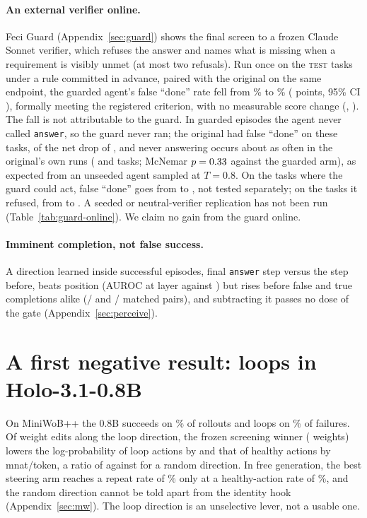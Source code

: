 \paragraph{An external verifier online.} Feci Guard (Appendix~\ref{sec:guard}) shows the final screen to a frozen Claude Sonnet verifier, which refuses the answer and names what is missing when a requirement is visibly unmet (at most two refusals). Run once on the \OgN{} \textsc{test} tasks under a rule committed in advance, paired with the original on the same endpoint, the guarded agent's false ``done'' rate fell from \OgFdBase\% to \OgFdGuard\% (\OgFdDiff{} points, 95\% CI \OgFdDiffCi), formally meeting the registered criterion, with no measurable score change (\OgScoreDiff, \OgScoreDiffCi). The fall is not attributable to the guard. In \ogDecNoAnsN{} guarded episodes the agent never called \texttt{answer}, so the guard never ran; the original had \ogDecNoAnsFdb{} false ``done'' on these tasks, \ogDecNoAnsFdb{} of the net drop of \ogFdNetDrop, and never answering occurs about as often in the original's own runs (\ogNoAnsModal{} and \ogNoAnsPod{} tasks; McNemar $p=0.33$ against the guarded arm), as expected from an unseeded agent sampled at $T=0.8$. On the \ogDecAnsN{} tasks where the guard could act, false ``done'' goes from \ogDecAnsFdb{} to \ogDecAnsFdg, not tested separately; on the \ogDecRefN{} tasks it refused, from \ogDecRefFdb{} to \ogDecRefFdg. A seeded or neutral-verifier replication has not been run (Table~\ref{tab:guard-online}). We claim no gain from the guard online.


\paragraph{Imminent completion, not false success.} A direction learned inside successful episodes, final \texttt{answer} step versus the step before, beats position (AUROC \pcAuc{} at layer \pcLayer{} against \pcBaseStep) but rises before false and true completions alike (\pcFsPosPositive/\pcMatchN{} and \pcFsNegPositive/\pcMatchN{} matched pairs), and subtracting it passes no dose of the gate (Appendix~\ref{sec:perceive}).

\section{A first negative result: loops in Holo-3.1-0.8B}
\label{nsec:mw}
On MiniWoB++ the 0.8B succeeds on \mwSuccessPct\% of \mwNNormal{} rollouts and loops on \mwLoopSharePct\% of failures. Of \mwOffNCand{} weight edits along the loop direction, the frozen screening winner (\mwPatchChanged{} weights) lowers the log-probability of loop actions by \mwFinLoopDec{} and that of healthy actions by \mwFinHealthyDec{} mnat/token, a ratio of \mwFinRatio{} against \mwFinRatioRand{} for a random direction. In free generation, the best steering arm reaches a repeat rate of \mwStNativeRepeat\% only at a healthy-action rate of \mwStNativeHealth\%, and the random direction cannot be told apart from the identity hook (Appendix~\ref{sec:mw}). The loop direction is an unselective lever, not a usable one.


